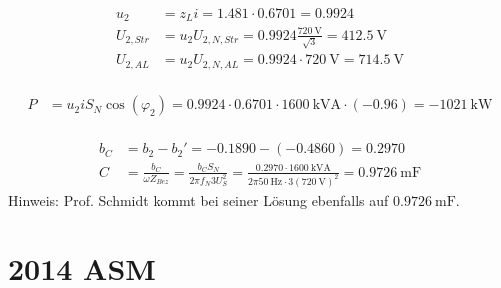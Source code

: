 \documentclass[11pt,a4paper]{scrartcl}
\newcommand{\mybr}[1]{\left(#1\right)}
\newcommand{\0}{_{\mybr{0}}}
\newcommand{\1}{_{\mybr{1}}}
\newcommand{\2}{_{\mybr{2}}}
\newcommand{\USS}{U_{2,Str}}
\newcommand{\USA}{U_{2,AL}}
\newcommand{\USNS}{U_{2,N,Str}}
\newcommand{\USNA}{U_{2,N,AL}}
\newcommand{\cz}{\cos\mybr{\varphi_2}}
\begin{document}
\subsection{}
\begin{align}
u_2&=z_L i=\num{1.481}\cdot\num{0.6701}=\num{0.9924}\\
\USS&=u_2\USNS=\num{0.9924}\frac{\SI{720}{\volt}}{\sqrt{3}}=\SI{412.5}{\volt}\\
\USA&=u_2\USNA=\num{0.9924}\cdot\SI{720}{\volt}=\SI{714.5}{\volt}
\end{align}

\subsection{}
\begin{align}
P&=u_2 i S_N \cz=\num{0.9924}\cdot\num{0.6701}\cdot\SI{1600}{\kilo\volt\ampere}\cdot\mybr{\num{-0.96}}=\SI{-1021}{\kilo\watt}
\end{align}

\subsection{}
\begin{align}
b_C&=b_2-b_2'=\num{-0.1890}-\mybr{\num{-0.4860}}=\num{0.2970}\\
C&=\frac{b_C}{\omega Z_{Bez}}=\frac{b_C S_N}{2\pi f_N 3 U_S^2}=\frac{0.2970\cdot\SI{1600}{\kilo\volt\ampere}}{2\pi\SI{50}{\hertz}\cdot 3\mybr{\SI{720}{\volt}}^2}=\SI{0.9726}{\milli\farad}
\end{align}
Hinweis: Prof. Schmidt kommt bei seiner Lösung ebenfalls auf $\SI{0.9726}{\milli\farad}$.

\clearpage
\part{2014 ASM}
\section{}
\end{document}
